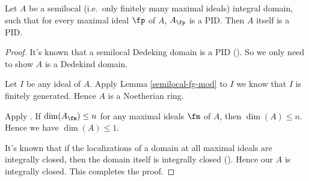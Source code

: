 \begin{lem}
\label{semilocal-PID}
\leanok
Let $A$ be a semilocal (i.e.~only finitely many maximal ideals)
integral domain,
such that for every maximal ideal $\fp$ of $A$, $A_\fp$ is a PID.
Then $A$ itself is a PID.
\end{lem}

\begin{proof}
\leanok
It's known that a semilocal Dedeking domain is a PID
().
So we only need to show $A$ is a Dedekind domain.

Let $I$ be any ideal of $A$. Apply Lemma \ref{semilocal-fg-mod} to $I$ we know that
$I$ is finitely generated. Hence $A$ is a Noetherian ring.

Apply . If $\dim(A_{\fm}) \le n$ for any maximal ideals $\fm$ of $A$,
then $\dim(A) \le n$. Hence we have $\dim(A) \le 1$.

It's known that if the localizations of a domain at all maximal ideals
are integrally closed, then the domain itself is integrally closed
().
Hence our $A$ is integrally closed. This completes the proof.
\end{proof}

